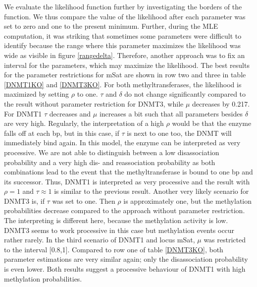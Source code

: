 We evaluate the likelihood function further by investigating the borders of the function. We thus compare the value of the likelihood after each parameter was set to zero and one to the present minimum. Further, during the \ac{MLE} computation, it was striking that sometimes some parameters were difficult to identify because the range where this parameter maximizes the likelihood was wide as visible in figure \ref{rangedelta}. Therefore, another approach was to fix an interval for the parameters, which may maximize the likelihood. The best results for the parameter restrictions for mSat are shown in row two and three in table \ref{DNMT1KO} and \ref{DNMT3KO}.\newline
For both methyltransferases, the likelihood is maximized by setting $\rho$ to one. $\tau$ and $\delta$ do not change significantly compared to the result without parameter restriction for DNMT3, while $\mu$ decreases by 0.217.\newline
For DNMT1 $\tau$ decreases and $\mu$ increases a bit such that all parameters besides $\delta$ are very high. Regularly, the interpretation of a high $\rho$ would be that the enzyme falls off at each \ac{bp}, but in this case, if $\tau$ is next to one too, the \ac{DNMT} will immediately bind again. In this model, the enzyme can be interpreted as very processive. We are not able to distinguish between a low disassociation probability and a very high dis- and reassociation probability as both combinations lead to the event that the methyltransferase is bound to one \ac{bp} and its successor. Thus, DNMT1 is interpreted as very processive and the result with $\rho=1$ and $\tau \approx 1$ is similar to the previous result.\newline
Another very likely scenario for DNMT3 is, if $\tau$ was set to one. Then $\rho$ is approximately one, but the methylation probabilities decrease compared to the approach without parameter restriction. The interpreting is different here, because the methylation activity is low. DNMT3 seems to work processive in this case but methylation events occur rather rarely.\newline
In the third scenario of DNMT1 and locus mSat, $\mu$ was restricted to the interval [0.8,1]. Compared to row one of table \ref{DNMT3KO}, both parameter estimations are very similar again; only the disassociation probability is even lower. Both results suggest a processive behaviour of DNMT1 with high methylation probabilities.\\

